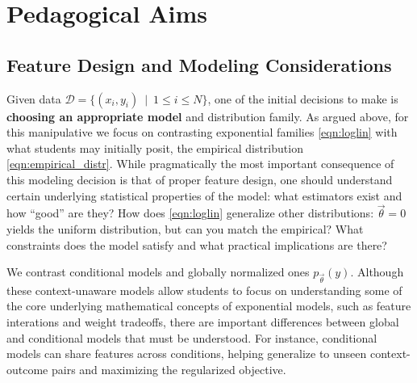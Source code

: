 \documentclass[11pt,letterpaper]{article}
\newcommand{\Data}[0]{\ensuremath{\mathcal{D}}}
\begin{document}

%
%
%


\section{Pedagogical Aims}\label{sec:aims}

\subsection{Feature Design and Modeling Considerations}

Given data $\Data{} = \{( x_i, y_i)\ \mid\ 1 \le i \le N\}$, one of the initial decisions 
to make is \textbf{choosing an appropriate model} and distribution family. 
As argued above, for this manipulative we focus on contrasting exponential families 
\eqref{eqn:loglin} with what students may initially posit, the empirical 
distribution \eqref{eqn:empirical_distr}. While pragmatically the most important 
consequence of this modeling decision is that of proper feature design, one should 
understand certain underlying statistical properties of the model: what estimators 
exist and how ``good'' are they? How does \eqref{eqn:loglin} generalize other 
distributions: $\vec{\theta} = 0$ yields the uniform distribution, but can you match 
the empirical? What constraints does the model satisfy and what practical implications
are there?
 
We contrast conditional models and globally normalized ones
$p_{\vec{\theta}}\left(y\right)$. Although
these context-unaware models allow students to focus on
understanding some of the core underlying mathematical concepts of
exponential models, such as feature interations and weight tradeoffs,
there are important differences between global and conditional models
that must be understood. For instance, conditional models can share 
features across conditions, helping generalize to unseen context-outcome 
pairs and maximizing the regularized objective.
\end{document}
